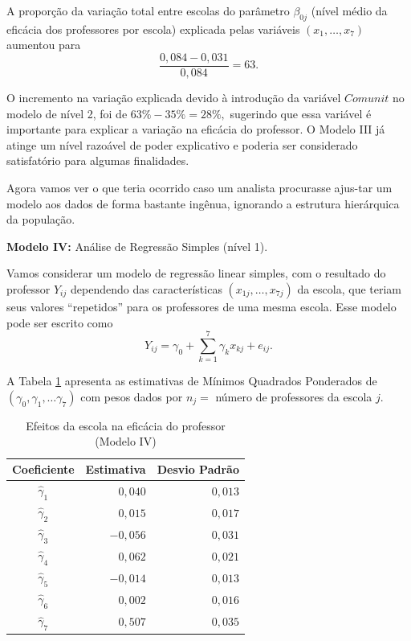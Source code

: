 \documentclass[]{book}
\numberwithin{example}{chapter}
\numberwithin{remark}{chapter}
\numberwithin{definition}{chapter}
\begin{document}
A proporção da variação total entre escolas do parâmetro \(\beta _{0j}\)
(nível médio da eficácia dos professores por escola) explicada pelas
variáveis \(\left( x_{1},\ldots ,x_{7}\right)\) aumentou para \[
\frac{0,084-0,031}{0,084}=63.
\]

O incremento na variação explicada devido à introdução da variável
\(Comunit\) no modelo de nível 2, foi de \(63\%-35\%=28\%,\) sugerindo
que essa variável é importante para explicar a variação na eficácia do
professor. O Modelo III já atinge um nível razoável de poder explicativo
e poderia ser considerado satisfatório para algumas finalidades.

Agora vamos ver o que teria ocorrido caso um analista procurasse
ajus-tar um modelo aos dados de forma bastante ingênua, ignorando a
estrutura hierárquica da população.

\textbf{Modelo IV:} Análise de Regressão Simples (nível 1).

Vamos considerar um modelo de regressão linear simples, com o resultado
do professor \(Y_{ij}\) dependendo das características
\(\left(x_{1j},\ldots ,x_{7j}\right)\) da escola, que teriam seus
valores ``repetidos'' para os professores de uma mesma escola. Esse
modelo pode ser escrito como \[
Y_{ij}=\gamma _{0}+\sum\limits_{k=1}^{7}\gamma _{k}x_{kj}+e_{ij}.
\]

A Tabela \ref{tab97} apresenta as estimativas de Mínimos Quadrados
Ponderados de
\(\left( \gamma _{0},\gamma _{1},\ldots \gamma _{7}\right)\) com pesos
dados por \(n_{j}=\) número de professores da escola \(j\).

\begin{center}
\begin{table}[tbp] \centering%
\caption{Efeitos da escola na eficácia do professor (Modelo IV)}\bigskip
\label{tab97}
\begin{tabular}{|c|c|c|}
\hline\hline
Coeficiente & Estimativa & Desvio Padrão \\ \hline\hline
$\hat{\gamma}_{1}$ & \multicolumn{1}{|r|}{$0,040$} & \multicolumn{1}{|r|}{$%
0,013$} \\
$\hat{\gamma}_{2}$ & \multicolumn{1}{|r|}{$0,015$} & \multicolumn{1}{|r|}{$%
0,017$} \\
$\hat{\gamma}_{3}$ & \multicolumn{1}{|r|}{$-0,056$} & \multicolumn{1}{|r|}{$%
0,031$} \\
$\hat{\gamma}_{4}$ & \multicolumn{1}{|r|}{$0,062$} & \multicolumn{1}{|r|}{$%
0,021$} \\
$\hat{\gamma}_{5}$ & \multicolumn{1}{|r|}{$-0,014$} & \multicolumn{1}{|r|}{$%
0,013$} \\
$\hat{\gamma}_{6}$ & \multicolumn{1}{|r|}{$0,002$} & \multicolumn{1}{|r|}{$%
0,016$} \\
$\hat{\gamma}_{7}$ & \multicolumn{1}{|r|}{$0,507$} & \multicolumn{1}{|r|}{$%
0,035$} \\ \hline\hline
\end{tabular}
\end{table}%
\end{center}
\end{document}
